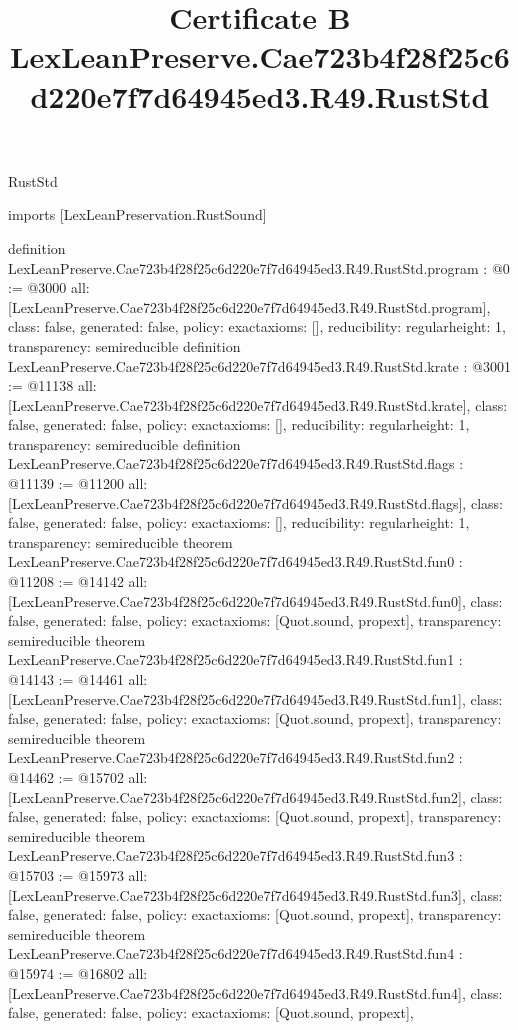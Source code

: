 \begin{lexlean}{RustStd}
\title{Certificate B LexLeanPreserve.Cae723b4f28f25c6d220e7f7d64945ed3.R49.RustStd}
\begin{coremodule}
imports [LexLeanPreservation.RustSound]

definition LexLeanPreserve.Cae723b4f28f25c6d220e7f7d64945ed3.R49.RustStd.program : @0 := @3000 {
  all: [LexLeanPreserve.Cae723b4f28f25c6d220e7f7d64945ed3.R49.RustStd.program],
  class: false,
  generated: false,
  policy: exact{axioms: []},
  reducibility: regular{height: 1},
  transparency: semireducible
}
definition LexLeanPreserve.Cae723b4f28f25c6d220e7f7d64945ed3.R49.RustStd.krate : @3001 := @11138 {
  all: [LexLeanPreserve.Cae723b4f28f25c6d220e7f7d64945ed3.R49.RustStd.krate],
  class: false,
  generated: false,
  policy: exact{axioms: []},
  reducibility: regular{height: 1},
  transparency: semireducible
}
definition LexLeanPreserve.Cae723b4f28f25c6d220e7f7d64945ed3.R49.RustStd.flags : @11139 := @11200 {
  all: [LexLeanPreserve.Cae723b4f28f25c6d220e7f7d64945ed3.R49.RustStd.flags],
  class: false,
  generated: false,
  policy: exact{axioms: []},
  reducibility: regular{height: 1},
  transparency: semireducible
}
theorem LexLeanPreserve.Cae723b4f28f25c6d220e7f7d64945ed3.R49.RustStd.fun0 : @11208 := @14142 {
  all: [LexLeanPreserve.Cae723b4f28f25c6d220e7f7d64945ed3.R49.RustStd.fun0],
  class: false,
  generated: false,
  policy: exact{axioms: [Quot.sound, propext]},
  transparency: semireducible
}
theorem LexLeanPreserve.Cae723b4f28f25c6d220e7f7d64945ed3.R49.RustStd.fun1 : @14143 := @14461 {
  all: [LexLeanPreserve.Cae723b4f28f25c6d220e7f7d64945ed3.R49.RustStd.fun1],
  class: false,
  generated: false,
  policy: exact{axioms: [Quot.sound, propext]},
  transparency: semireducible
}
theorem LexLeanPreserve.Cae723b4f28f25c6d220e7f7d64945ed3.R49.RustStd.fun2 : @14462 := @15702 {
  all: [LexLeanPreserve.Cae723b4f28f25c6d220e7f7d64945ed3.R49.RustStd.fun2],
  class: false,
  generated: false,
  policy: exact{axioms: [Quot.sound, propext]},
  transparency: semireducible
}
theorem LexLeanPreserve.Cae723b4f28f25c6d220e7f7d64945ed3.R49.RustStd.fun3 : @15703 := @15973 {
  all: [LexLeanPreserve.Cae723b4f28f25c6d220e7f7d64945ed3.R49.RustStd.fun3],
  class: false,
  generated: false,
  policy: exact{axioms: [Quot.sound, propext]},
  transparency: semireducible
}
theorem LexLeanPreserve.Cae723b4f28f25c6d220e7f7d64945ed3.R49.RustStd.fun4 : @15974 := @16802 {
  all: [LexLeanPreserve.Cae723b4f28f25c6d220e7f7d64945ed3.R49.RustStd.fun4],
  class: false,
  generated: false,
  policy: exact{axioms: [Quot.sound, propext]},
}
\end{coremodule}
\end{lexlean}
